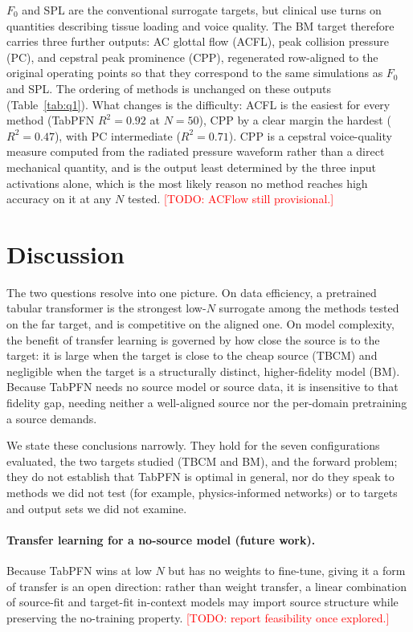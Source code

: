 \documentclass[11pt]{article}
\newcommand{\todo}[1]{\textcolor{red}{[TODO: #1]}}
\begin{document}
$F_0$ and SPL are the conventional surrogate targets, but clinical use turns on
quantities describing tissue loading and voice quality. The BM target therefore
carries three further outputs: AC glottal flow (ACFL), peak collision pressure
(PC), and cepstral peak prominence (CPP), regenerated row-aligned to the original
operating points so that they correspond to the same simulations as $F_0$ and SPL.
The ordering of methods is unchanged on these outputs (Table~\ref{tab:q1}). What
changes is the difficulty: ACFL is the easiest for every method (TabPFN
$R^2 = 0.92$ at $N=50$), CPP by a clear margin the hardest
($R^2 = 0.47$), with PC intermediate ($R^2 = 0.71$). CPP
is a cepstral voice-quality measure computed from the radiated pressure waveform
rather than a direct mechanical quantity, and is the output least determined by
the three input activations alone, which is the most likely reason no method
reaches high accuracy on it at any $N$ tested.
\todo{ACFlow still provisional.}

\section{Discussion}

The two questions resolve into one picture. On data efficiency, a pretrained
tabular transformer is the strongest low-$N$ surrogate among the methods tested on
the far target, and is competitive on the aligned one. On model complexity, the
benefit of transfer learning is governed by how close the source is to the target:
it is large when the target is close to the cheap source (TBCM) and negligible
when the target is a structurally distinct, higher-fidelity model (BM). Because
TabPFN needs no source model or source data, it is insensitive to that fidelity
gap, needing neither a well-aligned source nor the per-domain pretraining a source
demands.

We state these conclusions narrowly. They hold for the seven configurations
evaluated, the two targets studied (TBCM and BM), and the forward problem; they
do not establish that TabPFN is optimal in general, nor do they speak to methods
we did not test (for example, physics-informed networks) or to targets and output
sets we did not examine.

\paragraph{Transfer learning for a no-source model (future work).}
Because TabPFN wins at low $N$ but has no weights to fine-tune, giving it a form
of transfer is an open direction: rather than weight transfer, a linear
combination of source-fit and target-fit in-context models may import source
structure while preserving the no-training property. \todo{report feasibility once
explored.}
\end{document}
